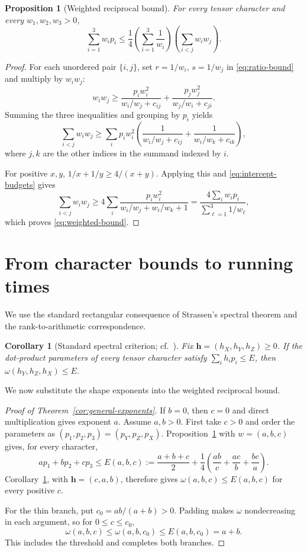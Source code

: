 \documentclass[11pt]{article}
\newtheorem{proposition}[theorem]{Proposition}
\newtheorem{corollary}[theorem]{Corollary}
\begin{document}
\begin{proposition}[Weighted reciprocal bound]\label{prop:weighted-bound}
For every tensor character and every $w_1,w_2,w_3>0$,
\begin{equation}\label{eq:weighted-bound}
 \sum_{i=1}^3w_ip_i\le
 \frac14\left(\sum_{i=1}^3\frac1{w_i}\right)
 \left(\sum_{i<j}w_iw_j\right).
\end{equation}
\end{proposition}

\begin{proof}
For each unordered pair $\{i,j\}$, set $r=1/w_i$, $s=1/w_j$ in
\eqref{eq:ratio-bound} and multiply by $w_iw_j$:
\[
 w_iw_j\ge
 \frac{p_iw_i^2}{w_i/w_j+c_{ij}}+
 \frac{p_jw_j^2}{w_j/w_i+c_{ji}}.
\]
Summing the three inequalities and grouping by $p_i$ yields
\[
 \sum_{i<j}w_iw_j\ge
 \sum_i p_iw_i^2\left(
 \frac1{w_i/w_j+c_{ij}}+\frac1{w_i/w_k+c_{ik}}\right),
\]
where $j,k$ are the other indices in the summand indexed by $i$.

For positive $x,y$, $1/x+1/y\ge4/(x+y)$. Applying this and
\eqref{eq:intercept-budgets} gives
\[
 \sum_{i<j}w_iw_j
 \ge4\sum_i\frac{p_iw_i^2}{w_i/w_j+w_i/w_k+1}
 =\frac{4\sum_iw_ip_i}{\sum_{\ell=1}^3 1/w_\ell},
\]
which proves \eqref{eq:weighted-bound}.
\end{proof}

\section{From character bounds to running times}\label{sec:exponents}\label{sec:general}

We use the standard rectangular consequence of Strassen's spectral
theorem and the rank-to-arithmetic correspondence.

\begin{corollary}[Standard spectral criterion; cf.\ {\cite[Corollary~3.30 and Example~2.21]{wigderson-zuiddam-2025-asymptotic-spectra}}]\label{lem:cost-conversion}
Fix $\mathbf h=(h_X,h_Y,h_Z)\ge0$. If the dot-product parameters of
every tensor character satisfy $\sum_i h_ip_i\le E$, then
$\omega(h_Y,h_Z,h_X)\le E$.
\end{corollary}

We now substitute the shape exponents into the weighted reciprocal bound.

\begin{proof}[Proof of Theorem~\ref{cor:general-exponents}]
If $b=0$, then $c=0$ and direct multiplication gives exponent $a$.
Assume $a,b>0$. First take $c>0$ and order the parameters as
$(p_1,p_2,p_3)=(p_Y,p_Z,p_X)$. Proposition~\ref{prop:weighted-bound}
with $w=(a,b,c)$ gives, for every character,
\[
 ap_1+bp_2+cp_3\le E(a,b,c):=
 \frac{a+b+c}{2}
 +\frac14\left(\frac{ab}{c}+\frac{ac}{b}+\frac{bc}{a}\right).
\]
Corollary~\ref{lem:cost-conversion}, with $\mathbf h=(c,a,b)$, therefore gives
$\omega(a,b,c)\le E(a,b,c)$ for every positive $c$.

For the thin branch, put $c_0=ab/(a+b)>0$. Padding makes $\omega$
nondecreasing in each argument, so for $0\le c\le c_0$,
\[
 \omega(a,b,c)\le\omega(a,b,c_0)\le E(a,b,c_0)=a+b.
\]
This includes the threshold and completes both branches.
\end{proof}
\end{document}
